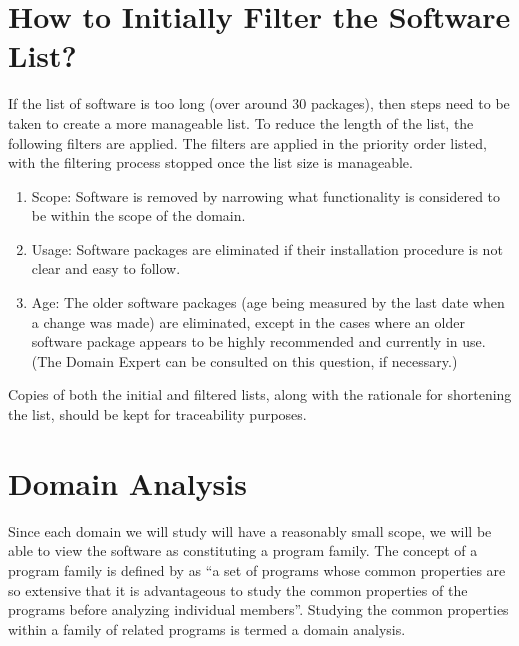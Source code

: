 \documentclass[letterpaper,cleveref]{lipics-v2019}
\begin{document}
\section{How to Initially Filter the Software List?} \label{SecInitialFilter}

If the list of software is too long (over around 30 packages), then steps need
to be taken to create a more manageable list. To reduce the length of the list,
the following filters are applied.  The filters are applied in the priority
order listed, with the filtering process stopped once the list size is
manageable.

\begin{enumerate}
\item Scope: Software is removed by narrowing what functionality is considered
  to be within the scope of the domain.
\item Usage: Software packages are eliminated if their installation procedure is
  not clear and easy to follow.
\item Age: The older software packages (age being measured by the last date when
  a change was made) are eliminated, except in the cases where an older software
  package appears to be highly recommended and currently in use.  (The Domain
  Expert can be consulted on this question, if necessary.)
\end{enumerate}

Copies of both the initial and filtered lists, along with the rationale for
shortening the list, should be kept for traceability purposes.

\section{Domain Analysis} \label{SecDomainAnalysis}

Since each domain we will study will have a reasonably small scope, we will be
able to view the software as constituting a program family.  The concept of a
program family is defined by \citet{parnas1976design} as ``a set of programs
whose common properties are so extensive that it is advantageous to study the
common properties of the programs before analyzing individual members''.
Studying the common properties within a family of related programs is termed a
domain analysis.
\end{document}
